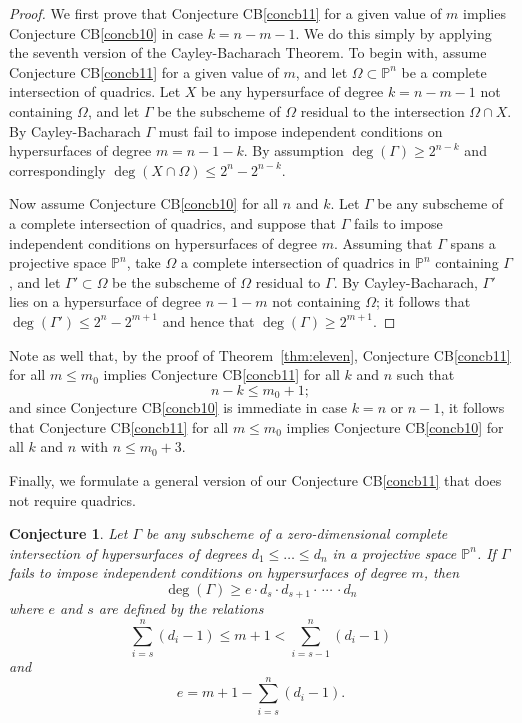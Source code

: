 \documentclass{bull-l}
\theoremstyle{pplain}
\newtheorem{concb}[thmcb]{Conjecture}
\theoremstyle{definition}
\begin{document}
\begin{proof} 
We first prove that Conjecture CB\ref{concb11} for a given value of $m$ implies 
Conjecture CB\ref{concb10} in case $k=n-m-1$.  We do this simply  by applying
the seventh version of the Cayley-Bacharach Theorem.  To begin with, assume
Conjecture CB\ref{concb11} for a given value  of $m$, and let $\Omega\subset
\mathbb{P}^n$ be a complete intersection of quadrics.  Let $X$ be any
hypersurface of degree $k=n-m-1$ not containing $\Omega$, and let $\Gamma$ be
the subscheme of $\Omega$ residual to the intersection $\Omega\cap X$.  By 
Cayley-Bacharach $\Gamma$ must fail to impose independent conditions on
hypersurfaces of degree $m=n-1-k$.  By assumption $\deg(\Gamma)\ge 2^{n-k}$ and
correspondingly $\deg(X\cap\Omega)\le 2^n-2^{n-k}$.

Now assume Conjecture CB\ref{concb10} for all $n$ and $k$.  Let $\Gamma$ be any
subscheme of a complete intersection of quadrics, and suppose that $\Gamma$
fails to impose independent conditions on hypersurfaces of degree $m$. 
Assuming that $\Gamma$ spans a projective space $\mathbb{P}^n$, take $\Omega$ a
complete intersection of quadrics in $\mathbb{P}^n$ containing $\Gamma$, and
let $\Gamma'\subset \Omega$ be the subscheme of $\Omega$ residual to $\Gamma$. 
By Cayley-Bacharach, $\Gamma'$ lies on a hypersurface of degree $n-1-m$ not
containing $\Omega$; it follows that $\deg(\Gamma')\le 2^n-2^{m+1}$ and hence
that $\deg(\Gamma)\ge 2^{m+1}$.
\end{proof}

Note as well that, by the proof of Theorem~\ref{thm:eleven}, Conjecture 
CB\ref{concb11} for all $m\le m_0$ implies Conjecture CB\ref{concb11} for all
$k$ and $n$ such that
\[n-k\le m_0+1;\]
and since Conjecture CB\ref{concb10} is immediate in case $k=n$ or $n-1$, it
follows that Conjecture CB\ref{concb11} for all $m\le m_0$ implies Conjecture 
CB\ref{concb10} for all $k$ and $n$ with $n\le m_0+3$.

Finally, we formulate a general version of our Conjecture CB\ref{concb11} that
does not require quadrics.

\begin{concb} \label{concb12}
Let $\Gamma$ be any subscheme of a zero-dimensional complete intersection of
hypersurfaces of degrees $d_1\le \dots\le d_n$ in a projective space
$\mathbb{P}^n$.  If $\Gamma$ fails to impose independent conditions on
hypersurfaces of degree $m$, then
\[\deg(\Gamma)\ge e\cdot d_s\cdot d_{s+1} \cdot\, \cdots\, \cdot d_n\]
where $e$ and $s$ are defined by the relations
\[\sum^n_{i=s} (d_i-1)\le m+1<\sum^n_{i=s-1} (d_i-1)\]
and
\[e=m+1-\sum^n_{i=s}(d_i-1).\]
\end{concb}
\end{document}
